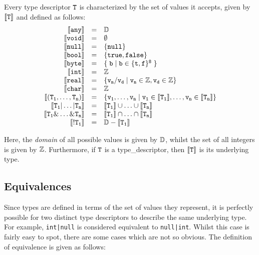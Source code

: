 \begin{definition}
\label{def_acceptance}
Every type descriptor ${\tt T}$ is characterized by the set of values it accepts,
given by ${\tt \llbracket T\rrbracket}$ and defined as follows:
\begin{displaymath}
\begin{array}{rcl}
{\tt\llbracket any\rrbracket} & = & \mathbb{D}\\
{\tt\llbracket void\rrbracket} & = & \emptyset\\
{\tt \llbracket null\rrbracket} & = & {\tt\{null\}}\\
{\tt\llbracket bool\rrbracket} & = & {\tt\{ true, false\}}\\
{\tt\llbracket byte\rrbracket} & = & {\tt\{\;b\;|\;b\in\{t,f\}^8\;\}}\\
{\tt\llbracket int\rrbracket} & = & {\tt\mathbb{Z}}\\
{\tt \llbracket real\rrbracket} & = & {\tt\{ v_n / v_d \;|\;v_n\in\mathbb{Z},v_d\in\mathbb{Z}\}}\\
{\tt\llbracket char\rrbracket} & = & {\tt\mathbb{Z}}\\
{\tt \llbracket(T_1, \ldots, T_n)\rrbracket} & = & {\tt\{ v_1,\ldots,v_n\;|\;v_1\in\llbracket T_1\rrbracket, \ldots, v_n\in\llbracket T_n\rrbracket\}}\\
{\tt\llbracket T_1|\ldots|T_n\rrbracket} & = & {\tt \llbracket T_1\rrbracket\cup\ldots\cup \llbracket T_n\rrbracket}\\
{\tt\llbracket T_1\&\ldots\&T_n\rrbracket} & = & {\tt \llbracket T_1\rrbracket\cap\ldots\cap \llbracket T_n\rrbracket}\\
{\tt\llbracket!T_1\rrbracket} & = & {\tt \mathbb{D} - \llbracket T_1\rrbracket}\\
\end{array}
\end{displaymath}
\end{definition}

\noindent Here, the {\em domain} of all possible values is given by ${\tt\mathbb{D}}$, whilst the set of all integers is given by ${\tt\mathbb{Z}}$.  Furthermore, if ${\tt T}$ is a \gls{type_descriptor}, then ${\tt\llbracket T\rrbracket}$ is its underlying \gls{type}.

\subsection{Equivalences}
Since types are defined in terms of the set of values they represent, it is perfectly possible for two distinct type descriptors to describe the same underlying type.  For example, \lstinline{int|null} is considered equivalent to \lstinline{null|int}.  Whilst this case is fairly easy to spot, there are some cases which are not so obvious.  The definition of equivalence is given as follows:

